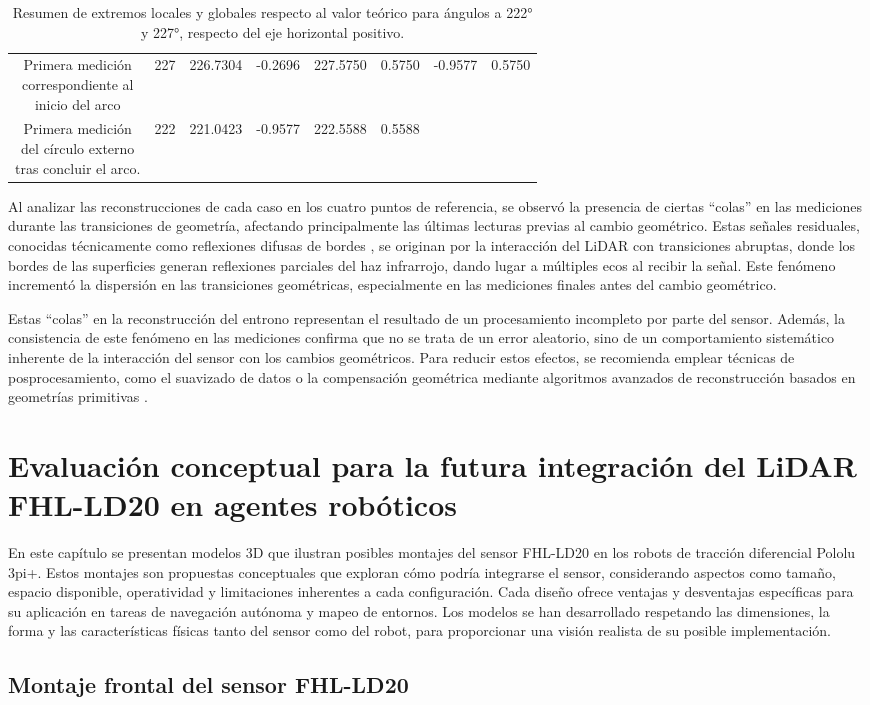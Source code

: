 \begin{table}[H]
{\begin{tabular}{|c|c|c|c|c|c|c|c|}
			\makecell{Primera medición\\ correspondiente al \\inicio del arco}  & 227 & 226.7304 & -0.2696 & 227.5750 & 0.5750 & \multirow{2}{*}{-0.9577} & \multirow{2}{*}{0.5750} \\ \cline{1-6}
			\makecell{Primera medición\\del círculo externo\\ tras concluir el arco.} & 222 & 221.0423 & -0.9577 & 222.5588 & 0.5588 & & \\ \hline
		\end{tabular}%
	}
	\caption{Resumen de extremos locales y globales respecto al valor teórico para ángulos a 222° y 227°, respecto del eje horizontal positivo.}
	\label{cuadro:dispersion_global_2}
\end{table}

Al analizar las reconstrucciones de cada caso en los cuatro puntos de referencia, se observó la presencia de ciertas ``colas'' en las mediciones durante las transiciones de geometría, afectando principalmente las últimas lecturas previas al cambio geométrico. Estas señales residuales, conocidas técnicamente como reflexiones difusas de bordes \cite{diffuse}, se originan por la interacción del LiDAR con transiciones abruptas, donde los bordes de las superficies generan reflexiones parciales del haz infrarrojo, dando lugar a múltiples ecos al recibir la señal. Este fenómeno incrementó la dispersión en las transiciones geométricas, especialmente en las mediciones finales antes del cambio geométrico. 

Estas ``colas'' en la reconstrucción del entrono representan el resultado de un procesamiento incompleto por parte del sensor. Además, la consistencia de este fenómeno en las mediciones confirma que no se trata de un error aleatorio, sino de un comportamiento sistemático inherente de la interacción del sensor con los cambios geométricos. Para reducir estos efectos, se recomienda emplear técnicas de posprocesamiento, como el suavizado de datos o la compensación geométrica mediante algoritmos avanzados de reconstrucción basados en geometrías primitivas \cite{primitive}.

\chapter{Evaluación conceptual para la futura integración del LiDAR FHL-LD20 en agentes robóticos}
En este capítulo se presentan modelos 3D que ilustran posibles montajes del sensor FHL-LD20 en los robots de tracción diferencial Pololu 3pi+. Estos montajes son propuestas conceptuales que exploran cómo podría integrarse el sensor, considerando aspectos como tamaño, espacio disponible, operatividad y limitaciones inherentes a cada configuración. Cada diseño ofrece ventajas y desventajas específicas para su aplicación en tareas de navegación autónoma y mapeo de entornos. Los modelos se han desarrollado respetando las dimensiones, la forma y las características físicas tanto del sensor como del robot, para proporcionar una visión realista de su posible implementación.

\section{Montaje frontal del sensor FHL-LD20}